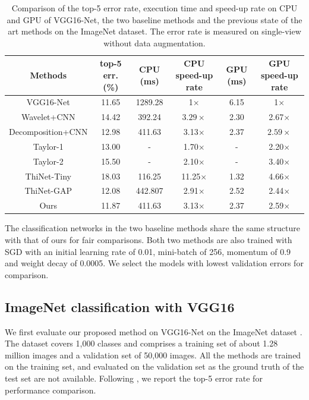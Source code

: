 \documentclass[letterpaper]{article} %
\begin{document}
\begin{table}[!t]
\centering
\begin{tabular}{c|c|c|c|c|c}
\hline
\centering  Methods  & top-5 err. (\%)& CPU (ms)  & CPU speed-up rate  & GPU (ms) & GPU speed-up rate\\
\hline
\hline
VGG16-Net   & 11.65  & 1289.28& 1$\times$ & 6.15&1$\times$  \\
\hline
Wavelet+CNN      &  14.42 & 392.24  & $3.29\times$  & 2.30  & 2.67$\times$  \\
Decomposition+CNN      &  12.98 & 411.63 & 3.13$\times$ & 2.37  & $2.59\times$\\
\hline
Taylor-1 & 13.00  & - & 1.70$\times$ & - & 2.20$\times$ \\
Taylor-2 & 15.50  & - & 2.10$\times$ & - & 3.40$\times$ \\
ThiNet-Tiny & 18.03  & 116.25  & 11.25$\times$ & 1.32 & 4.66$\times$ \\
ThiNet-GAP & 12.08  &442.807  & 2.91$\times$ &2.52 & 2.44$\times$\\
\hline
Ours   & 11.87  & 411.63 & 3.13$\times$ & 2.37  & 2.59$\times$ \\
\hline
\end{tabular}
\vspace{-8pt}
\caption{Comparison of the top-5 error rate, execution time and speed-up rate on CPU and GPU of VGG16-Net, the two baseline methods and the previous state of the art methods on the ImageNet dataset. The error rate is measured on single-view without data augmentation.}
\label{table:imagenet_comparison}
\end{table}

The classification networks in the two baseline methods share the same structure with that of ours for fair comparisons. Both two methods are also trained with SGD with an initial learning rate of 0.01, mini-batch of 256, momentum of 0.9 and weight decay of 0.0005. We select the models with lowest validation errors for comparison.

\subsection{ImageNet classification with VGG16}
We first evaluate our proposed method on VGG16-Net on the ImageNet dataset \cite{russakovsky2015imagenet}. The dataset covers 1,000 classes and comprises a training set of about 1.28 million images and a validation set of 50,000 images. All the methods are trained on the training set, and evaluated on the validation set as the ground truth of the test set are not available. Following \cite{zhang2016accelerating}, we report the top-5 error rate for performance comparison.
\end{document}
